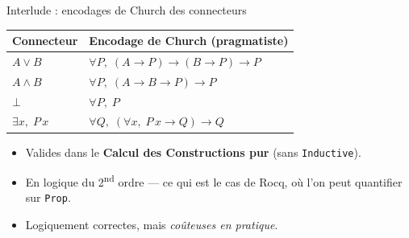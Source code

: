 \documentclass[aspectratio=169]{beamer}
\begin{document}
\begin{frame}{Interlude : encodages de Church des connecteurs}
  \begin{center}
    \begin{tabular}{ll}
      \hline
      \textbf{Connecteur} & \textbf{Encodage de Church (pragmatiste)} \\
      \hline
      $A \vee B$ & $\forall P,\; (A \to P) \to (B \to P) \to P$ \\[4pt]
      $A \wedge B$ & $\forall P,\; (A \to B \to P) \to P$ \\[4pt]
      $\bot$ & $\forall P,\; P$ \\[4pt]
      $\exists x,\; P\,x$ & $\forall Q,\; (\forall x,\; P\,x \to Q) \to Q$ \\
      \hline
    \end{tabular}
  \end{center}
  \medskip
  \begin{itemize}
    \item Valides dans le \textbf{Calcul des Constructions pur} (sans \texttt{Inductive}).
    \item En logique du 2\textsuperscript{nd} ordre — ce qui est le cas de Rocq, où l'on
      peut quantifier sur \texttt{Prop}.
    \item Logiquement correctes, mais \emph{coûteuses en pratique}.
  \end{itemize}
\end{frame}
\end{document}

